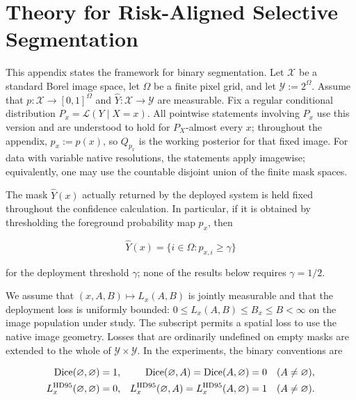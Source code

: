 \section{Theory for Risk-Aligned Selective Segmentation}
\label{app:theory}

This appendix states the framework for binary segmentation. Let
$\mathcal X$ be a standard Borel image space, let $\Omega$ be a finite pixel
grid, and let $\mathcal Y:=2^\Omega$. Assume that
$p:\mathcal X\to[0,1]^\Omega$ and
$\widehat Y:\mathcal X\to\mathcal Y$ are measurable. Fix a regular
conditional distribution $P_x=\mathcal L(Y\mid X=x)$. All pointwise
statements involving $P_x$ use this version and are understood to hold for
$P_X$-almost every $x$; throughout the appendix, \(p_x:=p(x)\), so
\(Q_{p_x}\) is the working posterior for that fixed image. For data with
variable native resolutions, the
statements apply imagewise; equivalently, one may use the countable disjoint
union of the finite mask spaces.

The mask $\widehat Y(x)$ actually returned by the deployed system is held fixed
throughout the confidence calculation. In particular, if it is obtained by
thresholding the foreground probability map $p_x$, then

\begin{equation*}
  \widehat Y(x)=\{i\in\Omega:p_{x,i}\geq\gamma\}
\end{equation*}

for the deployment threshold $\gamma$; none of the results below requires
$\gamma=1/2$.

We assume that $(x,A,B)\mapsto L_x(A,B)$ is jointly measurable and that the
deployment loss is uniformly bounded:
$0\leq L_x(A,B)\leq B_x\leq B<\infty$ on the image population under study.
The subscript permits a spatial loss to use the native image geometry.
Losses that are ordinarily undefined on empty masks are extended to the
whole of $\mathcal{Y}\times\mathcal{Y}$.  In the experiments, the binary
conventions are

\begin{align}
  \operatorname{Dice}(\varnothing,\varnothing)&=1,
  &\operatorname{Dice}(\varnothing,A)=\operatorname{Dice}(A,\varnothing)&=0
    &&(A\neq\varnothing),
  \label{app:eq:empty-dice}\\
  L_x^{\mathrm{HD95}}(\varnothing,\varnothing)&=0,
  &L_x^{\mathrm{HD95}}(\varnothing,A)
    =L_x^{\mathrm{HD95}}(A,\varnothing)&=1
    &&(A\neq\varnothing). \notag
\end{align}

